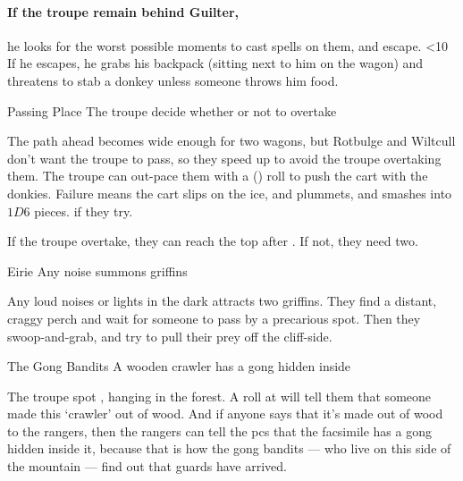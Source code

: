 \documentclass[10pt,twoside]{book}
\begin{document}

{\footnotesize
  \setcounter{diceNo}{1}
  \showStdSpells
}

\paragraph{If the troupe remain behind Guilter,}
he looks for the worst possible moments to cast \glspl{spell} on them, and escape.
\ifnum\thepage<10%
  If he escapes, he grabs his backpack (sitting next to him on the wagon) and threatens to stab a donkey unless someone throws him food.
\fi

{Passing Place}%
{The troupe decide whether or not to overtake}%

The path ahead becomes wide enough for two wagons, but Rotbulge and Wiltcull don't want the troupe to pass, so they speed up to avoid the troupe overtaking them.
The troupe can out-pace them
\ifnum{}
  with a  (\tn[8]) roll to push the cart with the donkies.
  Failure means the cart slips on the ice, and plummets, and smashes into $1D6$ pieces.
\else%
  if they try.
\fi

If the troupe overtake, they can reach the top after .
If not, they need two.

{Eirie}%
{Any noise summons \glspl{griffin}}%


Any loud noises or lights in the dark attracts two \glspl{griffin}.
They find a distant, craggy perch and wait for someone to pass by a precarious spot.
Then they swoop-and-grab, and try to pull their prey off the cliff-side.

{The Gong Bandits}%
{A wooden \gls{crawler} has a gong hidden inside}%


The troupe spot , hanging in the forest.
A  roll at \tn[12] will tell them that someone made this `\gls{crawler}' out of wood.
And if anyone says that it's made out of wood to the \glspl{ranger}, then the \glspl{ranger} can tell the \glspl{pc} that the facsimile has a gong hidden inside it, because that is how the gong bandits --- who live on this side of the mountain --- find out that \glspl{guard} have arrived.
\end{document}
